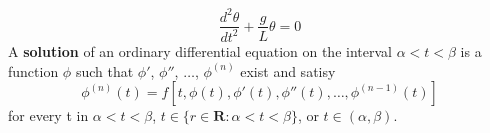     \begin{equation*}
        \frac{d^2\theta}{dt^2} + \frac{g}{L} \theta = 0
    \end{equation*}
    A \textbf{solution} of an ordinary differential equation on the interval $\alpha < t < \beta$ is a function $\phi$ such that $\phi'$, $\phi''$, $\dots$, $\phi^{(n)}$ exist and satisy
    \begin{equation*}
        \phi^{(n)}(t) = f[t, \phi(t), \phi'(t), \phi''(t), \dots, \phi^{(n - 1)}(t)]
    \end{equation*}
    for every t in $\alpha < t < \beta$, $t \in \{r \in \textbf{R}: \alpha < t < \beta\}$, or $t \in (\alpha, \beta)$.